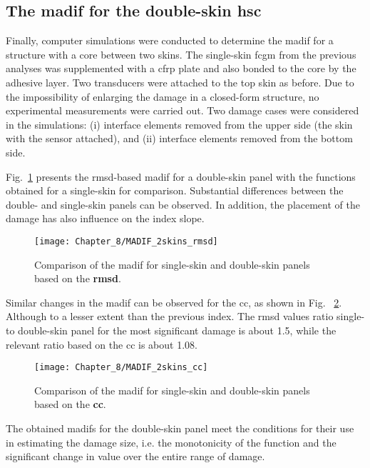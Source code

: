 \subsection{The \ac{madif} for the double-skin \ac{hsc}}

Finally, computer simulations were conducted to determine the \ac{madif} for a structure with a core between two skins.
The single-skin \ac{fcgm} from the previous analyses was supplemented with a \ac{cfrp} plate and also bonded to the core by the adhesive layer.
Two transducers were attached to the top skin as before.
Due to the impossibility of enlarging the damage in a closed-form structure, no experimental measurements were carried out.
Two damage cases were considered in the simulations: (i) interface elements removed from the upper side (the skin with the sensor attached), and (ii) interface elements removed from the bottom side.

Fig.~\ref{fig:madif_2skins_rmsd} presents the \ac{rmsd}-based \ac{madif} for a double-skin panel with the functions obtained for a single-skin for comparison.
Substantial differences between the double- and single-skin panels can be observed.
In addition, the placement of the damage has also influence on the index slope.
\begin{figure}[!htb]
	\begin{center}
		\texttt{[image: Chapter\_8/MADIF\_2skins\_rmsd]}
	\end{center}
	\caption{Comparison of the \acf{madif} for single-skin and double-skin panels based on the\textbf{ \acf{rmsd}}.}
	\label{fig:madif_2skins_rmsd}
\end{figure}

Similar changes in the \ac{madif} can be observed for the \ac{cc}, as shown in Fig. ~\ref{fig:madif_2skins_cc}.
Although to a lesser extent than the previous index. 
The \ac{rmsd} values ratio single- to double-skin panel for the most significant damage is about 1.5, while the relevant ratio based on the \ac{cc} is about 1.08.
\begin{figure}[!htb]
	\begin{center}
		\texttt{[image: Chapter\_8/MADIF\_2skins\_cc]}
	\end{center}
	\caption{Comparison of the \acf{madif} for single-skin and double-skin panels based on the \textbf{\acf{cc}}.}
	\label{fig:madif_2skins_cc}
\end{figure}

The obtained \acp{madif} for the double-skin panel meet the conditions for their use in estimating the damage size, i.e. the monotonicity of the function and the significant change in value over the entire range of damage.